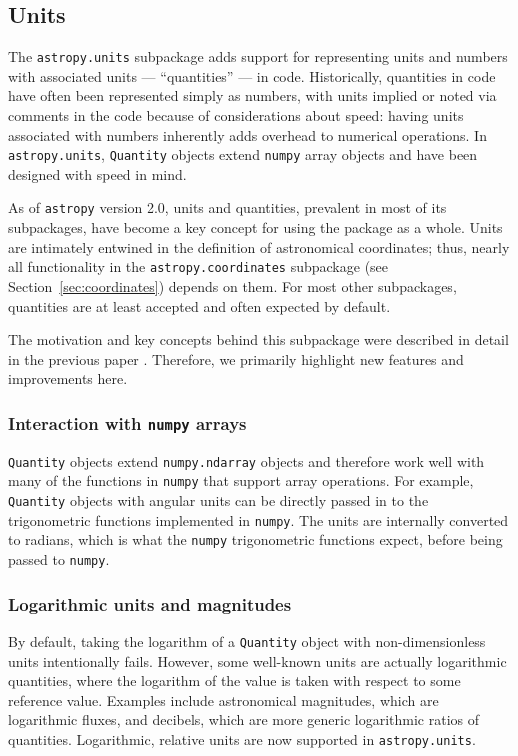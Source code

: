 \documentclass[modern]{aastex61}
\newcommand{\package}[1]{\texttt{#1}\xspace}
\newcommand{\astropypkg}{\package{astropy}}
\newcommand{\sectionname}{Section\xspace}
\begin{document}
\subsection{Units}\label{sec:units}

The \texttt{astropy.units} subpackage adds support for representing units and
numbers with associated units --- ``quantities'' --- in code.
Historically, quantities in code have often been represented simply as numbers,
with units implied or noted via comments in the code because of considerations
about speed: having units associated with numbers inherently adds overhead to
numerical operations.
In \texttt{astropy.units}, \texttt{Quantity} objects extend \texttt{numpy}
array objects and have been designed with speed in mind.

As of \astropypkg version 2.0, units and quantities, prevalent in most of its
subpackages, have become a key concept for using the package as a whole.
Units are intimately entwined in the definition of astronomical coordinates;
thus, nearly all functionality in the \texttt{astropy.coordinates} subpackage
(see \sectionname~\ref{sec:coordinates}) depends on them.
For most other subpackages, quantities are at least accepted and often expected
by default.

The motivation and key concepts behind this subpackage were described in detail
in the previous paper \citep{astropy}. Therefore, we primarily highlight new
features and improvements here.

\subsubsection{Interaction with \package{numpy} arrays}

\texttt{Quantity} objects extend
\texttt{numpy.ndarray} objects and therefore
work well with many of the functions in \texttt{numpy} that support
array operations. For example, \texttt{Quantity} objects with angular
units can be directly passed in to the trigonometric functions implemented in
\texttt{numpy}. The units are internally converted to radians, which is what
the \texttt{numpy} trigonometric functions expect, before being passed to
\texttt{numpy}.

\subsubsection{Logarithmic units and magnitudes}
        By default, taking the logarithm of
        a \texttt{Quantity} object with non-dimensionless units intentionally
        fails.
        However, some well-known units are actually logarithmic quantities,
        where the logarithm of the value is taken with respect to some reference
        value.
        Examples include astronomical magnitudes, which are logarithmic fluxes,
        and decibels, which are more generic logarithmic ratios of quantities.
        Logarithmic, relative units are now supported in \texttt{astropy.units}.
\end{document}
